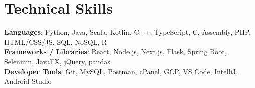 \documentclass[letterpaper,11pt]{article}
\begin{document}
\section{Technical Skills}
 \begin{itemize}[leftmargin=0.15in, label={}]
    \small{\item{
     \textbf{Languages}{: Python, Java, Scala, Kotlin, C++, TypeScript, C, Assembly, PHP, HTML/CSS/JS, SQL, NoSQL, R} \\
     \textbf{Frameworks / Libraries}{: React, Node.js, Next.js, Flask, Spring Boot, Selenium, JavaFX, jQuery, pandas} \\
     \textbf{Developer Tools}{: Git, MySQL, Postman, cPanel, GCP, VS Code, IntelliJ, Android Studio}
    }}
 \end{itemize}


\end{document}
